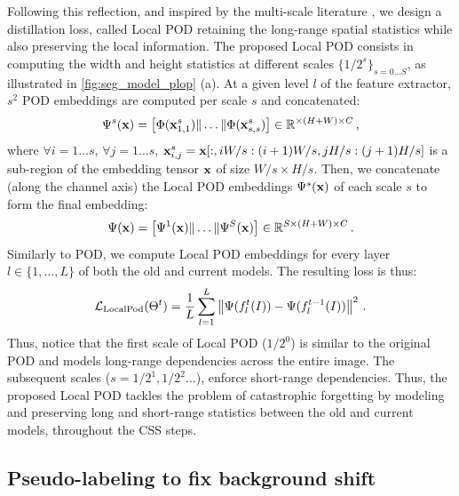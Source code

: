 Following this reflection, and inspired by the multi-scale literature
\citep{lazbnik2006spatial_pyramid_matching,he2014spatialpyramidpooling}, we design a distillation
loss, called Local POD retaining the long-range spatial statistics while also preserving the local
information. The proposed Local POD consists in computing the width and height statistics at
different scales $\{1/2^s\}_{s=0 \dots S}$, as illustrated in \autoref{fig:seg_model_plop} (a). At a
given level $l$ of the feature extractor, $s^2$ POD embeddings are computed per scale $s$ and
concatenated:
%
\begin{equation}
    \Psi^s(\mathbf{x}) = \left[ \Phi(\mathbf{x}^s_{1,1}) \| \dots \| \Phi(\mathbf{x}^s_{s,s}) \right] \in \mathbb{R}^{\times (H + W) \times C}\,,
    \label{eq:seg_localpod_embedding1}
\end{equation}
%
where $\forall i = 1 \dots s$, $\forall j = 1 \dots s$, $\mathbf{x}^s_{i,j} = \mathbf{x}[:, i W/s:(i+1) W/s, j
        H/s:(j+1) H/s]$ is a sub-region of the embedding tensor $\mathbf{x}$ of size $W/s \times H/s$.
Then, we concatenate (along the channel axis) the Local POD embeddings $\Psi^s(\mathbf{x})$ of each
scale $s$ to form the final embedding:
%
\begin{equation}
    \Psi(\mathbf{x}) = \left[ \Psi^1(\mathbf{x}) \| \dots \| \Psi^S(\mathbf{x}) \right] \in \mathbb{R}^{S \times (H + W) \times C}\,.
    \label{eq:seg_local_pod}
\end{equation}
%
Similarly to POD, we compute Local POD embeddings for every layer $l \in \{1, \dots, L\}$ of both
the old and current models. The resulting loss is thus:
%
\begin{equation}
    \mathcal{L}_{\scriptstyle\text{LocalPod}}(\Theta^t) = \frac{1}{L} \sum_{l = 1}^L \left\Vert  {\Psi}(f^t_l(I)) -  {\Psi}(f^{t-1}_l(I)) \right\Vert^2\,.
    \label{eq:seg_local_pod_loss}
\end{equation}
%
Thus, notice that the first scale of Local POD ($1/2^0$) is similar to the original POD and models
long-range dependencies across the entire image. The subsequent scales ($s=1/2^1, 1/2^2 \dots$),
enforce short-range dependencies. Thus, the proposed Local POD tackles the problem of catastrophic
forgetting by modeling and preserving long and short-range statistics between the old and current
models, throughout the \ac{CSS} steps.


\subsection{Pseudo-labeling to fix background shift}\label{sec:seg_hardpl}

